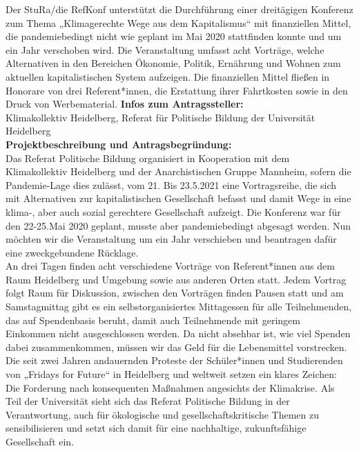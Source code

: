 {
    Der StuRa/die RefKonf unterstützt die Durchführung einer dreitägigen Konferenz zum Thema „Klimagerechte Wege aus dem Kapitalismus“ mit finanziellen Mittel, die pandemiebedingt nicht wie geplant im Mai 2020 stattfinden konnte und um ein Jahr verschoben wird. Die Veranstaltung umfasst acht Vorträge, welche Alternativen in den Bereichen Ökonomie, Politik, Ernährung und Wohnen zum aktuellen kapitalistischen System aufzeigen. Die finanziellen Mittel fließen in Honorare von drei Referent*innen, die Erstattung ihrer Fahrtkosten sowie in den Druck von Werbematerial.
}{
    \textbf{Infos zum Antragssteller:}\\
    Klimakollektiv Heidelberg, Referat für Politische Bildung der Universität Heidelberg\\[1em]
    \textbf{Projektbeschreibung und Antragsbegründung:}\\
    Das Referat Politische Bildung organisiert in Kooperation mit dem Klimakollektiv Heidelberg und der Anarchistischen Gruppe Mannheim, sofern die Pandemie-Lage dies zulässt, vom 21. Bis 23.5.2021 eine Vortragsreihe, die sich mit Alternativen zur kapitalistischen Gesellschaft befasst und damit Wege in eine klima-, aber auch sozial gerechtere Gesellschaft aufzeigt. Die Konferenz war für den 22-25.Mai 2020 geplant, musste aber pandemiebedingt abgesagt werden. Nun möchten wir die Veranstaltung um ein Jahr verschieben und beantragen dafür eine zweckgebundene Rücklage.\\
    An drei Tagen finden acht verschiedene Vorträge von Referent*innen aus dem Raum Heidelberg und Umgebung sowie aus anderen Orten statt. Jedem Vortrag folgt Raum für Diskussion, zwischen den Vorträgen finden Pausen statt und am Samstagmittag gibt es ein selbstorganisiertes Mittagessen für alle Teilnehmenden, das auf Spendenbasis beruht, damit auch Teilnehmende mit geringem Einkommen nicht ausgeschlossen werden. Da nicht absehbar ist, wie viel Spenden dabei zusammenkommen, müssen wir das Geld für die Lebensmittel vorstrecken.\\
    Die seit zwei Jahren andauernden Proteste der Schüler*innen und Studierenden von „Fridays for Future“ in Heidelberg und weltweit setzen ein klares Zeichen: Die Forderung nach konsequenten Maßnahmen angesichts der Klimakrise. Als Teil der Universität sieht sich das Referat Politische Bildung in der Verantwortung, auch für ökologische und gesellschaftskritische Themen zu sensibilisieren und setzt sich damit für eine nachhaltige, zukunftsfähige Gesellschaft ein.\\
}
